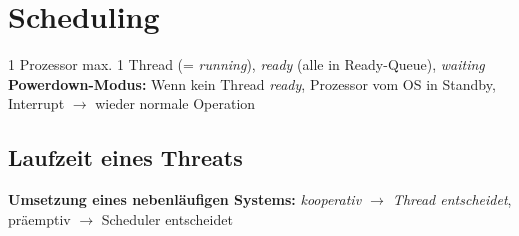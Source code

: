 \section{Scheduling}
1 Prozessor max. 1 Thread (= \textit{running}), \textit{ready} (alle in Ready-Queue), \textit{waiting}
\textbf{Powerdown-Modus: }Wenn kein Thread \textit{ready}, Prozessor vom OS in Standby, Interrupt $\rightarrow$ wieder normale Operation


\subsection{Laufzeit eines Threats}
\textbf{Umsetzung eines nebenläufigen Systems: }\textit{kooperativ $\rightarrow$ Thread entscheidet}, präemptiv $\rightarrow$ Scheduler entscheidet


